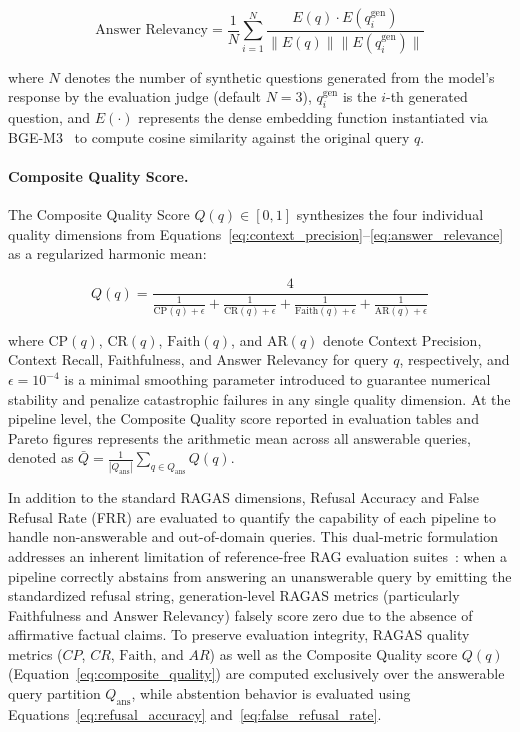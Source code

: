 \begin{equation}
\label{eq:answer_relevance}
\text{Answer Relevancy} = \frac{1}{N} \sum_{i=1}^{N} \frac{E(q) \cdot E(q_i^{\text{gen}})}{\|E(q)\| \|E(q_i^{\text{gen}})\|}
\end{equation}

where $N$ denotes the number of synthetic questions generated from the model's response by the evaluation judge (default $N = 3$), $q_i^{\text{gen}}$ is the $i$-th generated question, and $E(\cdot)$ represents the dense embedding function instantiated via BGE-M3~\citep{chen2024bge} to compute cosine similarity against the original query $q$.

\paragraph{Composite Quality Score.} The Composite Quality Score $Q(q) \in [0, 1]$ synthesizes the four individual quality dimensions from Equations~\ref{eq:context_precision}--\ref{eq:answer_relevance} as a regularized harmonic mean:

\begin{equation}
\label{eq:composite_quality}
Q(q) = \frac{4}{\frac{1}{\text{CP}(q) + \epsilon} + \frac{1}{\text{CR}(q) + \epsilon} + \frac{1}{\text{Faith}(q) + \epsilon} + \frac{1}{\text{AR}(q) + \epsilon}}
\end{equation}

where $\text{CP}(q)$, $\text{CR}(q)$, $\text{Faith}(q)$, and $\text{AR}(q)$ denote Context Precision, Context Recall, Faithfulness, and Answer Relevancy for query $q$, respectively, and $\epsilon = 10^{-4}$ is a minimal smoothing parameter introduced to guarantee numerical stability and penalize catastrophic failures in any single quality dimension. At the pipeline level, the Composite Quality score reported in evaluation tables and Pareto figures represents the arithmetic mean across all answerable queries, denoted as $\bar{Q} = \frac{1}{|Q_{\text{ans}}|} \sum_{q \in Q_{\text{ans}}} Q(q)$.

In addition to the standard RAGAS dimensions, Refusal Accuracy and False Refusal Rate (FRR) are evaluated to quantify the capability of each pipeline to handle non-answerable and out-of-domain queries. This dual-metric formulation addresses an inherent limitation of reference-free RAG evaluation suites~\citep{es2024ragas}: when a pipeline correctly abstains from answering an unanswerable query by emitting the standardized refusal string, generation-level RAGAS metrics (particularly Faithfulness and Answer Relevancy) falsely score zero due to the absence of affirmative factual claims. To preserve evaluation integrity, RAGAS quality metrics ($CP$, $CR$, $\text{Faith}$, and $AR$) as well as the Composite Quality score $Q(q)$ (Equation~\ref{eq:composite_quality}) are computed exclusively over the answerable query partition $Q_{\text{ans}}$, while abstention behavior is evaluated using Equations~\ref{eq:refusal_accuracy} and~\ref{eq:false_refusal_rate}.

